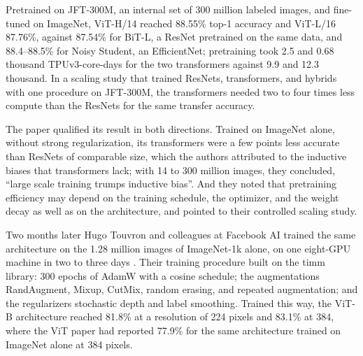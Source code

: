 \begin{refsection}
\begin{finding}\label{fd:confounding:vit}
Pretrained on JFT-300M, an internal set of 300 million labeled images, and fine-tuned on ImageNet, ViT-H/14 reached 88.55\% top-1 accuracy and ViT-L/16 87.76\%, against 87.54\% for BiT-L, a ResNet pretrained on the same data, and 88.4--88.5\% for Noisy Student, an EfficientNet; pretraining took 2.5 and 0.68 thousand TPUv3-core-days for the two transformers against 9.9 and 12.3 thousand. In a scaling study that trained ResNets, transformers, and hybrids with one procedure on JFT-300M, the transformers needed two to four times less compute than the ResNets for the same transfer accuracy.
\end{finding}

The paper qualified its result in both directions. Trained on ImageNet alone, without strong regularization, its transformers were a few points less accurate than ResNets of comparable size, which the authors attributed to the inductive biases that transformers lack; with 14 to 300 million images, they concluded, \enquote{large scale training trumps inductive bias}. And they noted that pretraining efficiency may depend on the training schedule, the optimizer, and the weight decay as well as on the architecture, and pointed to their controlled scaling study.

Two months later Hugo Touvron and colleagues at Facebook AI trained the same architecture on the 1.28 million images of ImageNet-1k alone, on one eight-GPU machine in two to three days \parencite{TouvronEtAl2021}. Their training procedure built on the timm library: 300 epochs of AdamW with a cosine schedule; the augmentations RandAugment, Mixup, CutMix, random erasing, and repeated augmentation; and the regularizers stochastic depth and label smoothing. Trained this way, the ViT-B architecture reached 81.8\% at a resolution of 224 pixels and 83.1\% at 384, where the ViT paper had reported 77.9\% for the same architecture trained on ImageNet alone at 384 pixels.


\end{refsection}
